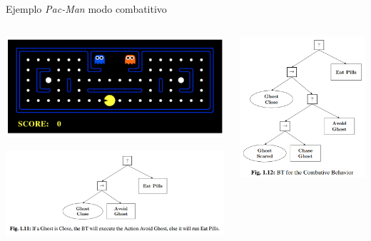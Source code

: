 \documentclass[presentation,aspectratio=169]{beamer}
\begin{document}
\begin{frame}[label={sec:org5ab115f}]{Ejemplo \emph{Pac-Man} modo combatitivo}
\begin{columns}
\begin{column}{0.6\columnwidth}
\includegraphics[width=0.6\linewidth]{../figures/bt-book-fig-1_10.png}

\includegraphics[width=\linewidth]{../figures/bt-book-fig-1_11.png}
\end{column}

\begin{column}{0.4\columnwidth}
\pause


\begin{center}
  \includegraphics[width=\linewidth]{../figures/bt-book-fig-1_12.png}
\end{center}
\end{column}
\end{columns}
\end{frame}
\end{document}
